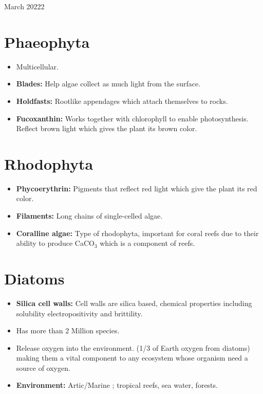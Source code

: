 \documentclass[12pt,oneside]{book} %
\begin{document}
\begin{lec}{March 20222}
  \section*{Phaeophyta}

  \begin{itemize}
    \item Multicellular.
    \item \textbf{Blades:} Help algae collect as much light from the surface.
    \item \textbf{Holdfasts:} Rootlike appendages which attach themselves to rocks.
    \item \textbf{Fucoxanthin:} Works together with chlorophyll to enable photosynthesis. Reflect brown light which gives the
       plant its brown color.
  \end{itemize}

  \newpage

  \section*{Rhodophyta}
  \begin{itemize}
    \item \textbf{Phycoerythrin:} Pigments that reflect red light which give the plant its red color.
    \item \textbf{Filaments:} Long chains of single-celled algae.
    \item \textbf{Coralline algae:} Type of rhodophyta, important for coral reefs due to their ability to produce CaCO$_3$ which
       is a component of reefs. 
  \end{itemize}

  \section*{Diatoms}
  \begin{itemize}
    \item \textbf{Silica cell walls:} Cell walls are silica based, chemical properties including solubility
       electropositivity and brittility. 
    \item Has more than 2 Million species.
    \item Release oxygen into the environment. (1/3 of Earth oxygen from diatoms) making them a vital component to any
       ecosystem whose organism need a source of oxygen.
    \item \textbf{Environment:} Artic/Marine ; tropical reefs, sea water, forests.
  \end{itemize}


\end{lec}
\end{document}
